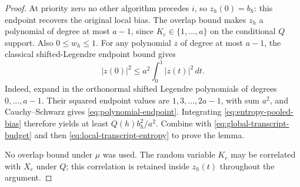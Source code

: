 \begin{proof}
At priority zero no other algorithm precedes $i$, so $z_h(0)=b_h$:
this endpoint recovers the original local bias. The overlap bound makes
$z_h$ a polynomial of degree at most $a-1$, since
$K_e\in\{1,\ldots,a\}$ on the conditional $Q$ support. Also
$0\le w_h\le1$. For any polynomial $z$ of degree
at most $a-1$, the classical shifted-Legendre endpoint bound
\cite[Tables~18.3.1 and~18.6.1]{DLMF} gives
\begin{equation}\label{eq:polynomial-endpoint}
 |z(0)|^2\le a^2\int_0^1|z(t)|^2\,dt.
\end{equation}
Indeed, expand in the orthonormal shifted Legendre polynomials of
degrees $0,\ldots,a-1$. Their squared endpoint values are
$1,3,\ldots,2a-1$, with sum $a^2$, and Cauchy--Schwarz gives
\eqref{eq:polynomial-endpoint}.
Integrating \eqref{eq:entropy-pooled-bias} therefore yields at least
$Q(h)b_h^2/a^2$. Combine with
\eqref{eq:global-transcript-budget} and then
\eqref{eq:local-transcript-entropy} to prove the lemma.

No overlap bound under $\mu$ was used. The random variable $K_e$ may
be correlated with $X_e$ under $Q$; this correlation is retained inside
$z_h(t)$ throughout the argument.
\end{proof}
